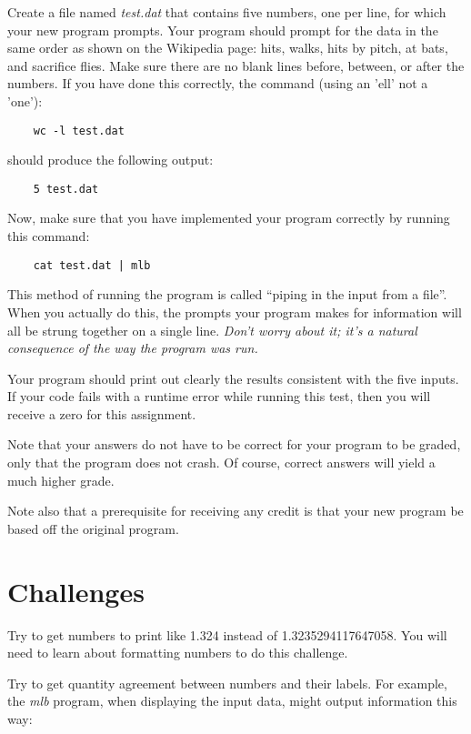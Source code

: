 \documentclass[12pt]{article}
\begin{document}
Create a file named {\it test.dat} that contains five numbers,
one per line,
for which your new program prompts.
Your program should prompt for the data in the same order as shown
on the Wikipedia page: hits, walks, hits by pitch, at bats, and
sacrifice flies.
Make sure there are no blank lines before, between, or after
the numbers.
If you have done this correctly, the command
(using an 'ell' not a 'one'):

\begin{verbatim}
    wc -l test.dat
\end{verbatim}
    
should produce the following output:

\begin{verbatim}
    5 test.dat
\end{verbatim}

Now, make sure that you have implemented your
program correctly by running this command:
    
\begin{verbatim}
    cat test.dat | mlb
\end{verbatim}

This method of running the program is called ``piping in the input from
a file''.
When you actually do this, the prompts your program makes for information
will all be strung together on a single line.
{\it Don't worry about it; it's a natural consequence of the way the
program was run.}

Your program should print out clearly the results
consistent with the five inputs.
\color{red}
If your code fails with a runtime error while running this test,
then you will receive a zero for this assignment.
\color{black}

Note that your answers do not have to be correct for your program to be graded,
only that the program does not crash. Of course, correct answers will yield 
a much higher grade.

Note also that a prerequisite for receiving any credit
is that your new program be based off the original program.

\section*{Challenges}

Try to get numbers to print like 1.324 instead of 1.3235294117647058.
You will need to learn about formatting numbers to do this challenge.

Try to get quantity agreement between numbers and their labels. For
example, the {\it mlb} program, when displaying the input data,
might output information this way:
\end{document}
